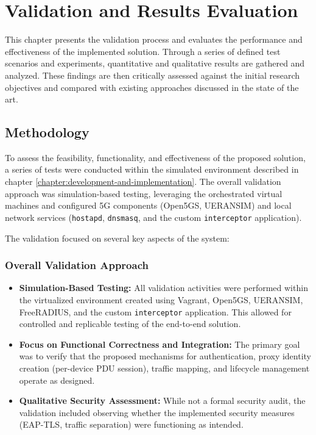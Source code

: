\chapter{Validation and Results Evaluation}%
\label{chapter:validation-and-results-evaluation}

\begin{introduction}
This chapter presents the validation process and evaluates the performance and effectiveness of the implemented solution. Through a series of defined test scenarios and experiments, quantitative and qualitative results are gathered and analyzed. These findings are then critically assessed against the initial research objectives and compared with existing approaches discussed in the state of the art.
\end{introduction}

\section{Methodology}

To assess the feasibility, functionality, and effectiveness of the proposed solution, a series of tests were conducted within the simulated environment described in chapter \ref{chapter:development-and-implementation}. The overall validation approach was simulation-based testing, leveraging the orchestrated virtual machines and configured \ac{5G} components (Open5GS, UERANSIM) and local network services (\texttt{hostapd}, \texttt{dnsmasq}, and the custom \texttt{interceptor} application).

The validation focused on several key aspects of the system:

\subsection{Overall Validation Approach}

\begin{itemize}
    \item \textbf{Simulation-Based Testing:} All validation activities were performed within the virtualized environment created using Vagrant, Open5GS, UERANSIM, FreeRADIUS, and the custom \texttt{interceptor} application. This allowed for controlled and replicable testing of the end-to-end solution.

    \item \textbf{Focus on Functional Correctness and Integration:} The primary goal was to verify that the proposed mechanisms for authentication, proxy identity creation (per-device \ac{PDU} session), traffic mapping, and lifecycle management operate as designed.

    \item \textbf{Qualitative Security Assessment:} While not a formal security audit, the validation included observing whether the implemented security measures (\ac{EAP-TLS}, traffic separation) were functioning as intended.
\end{itemize}

